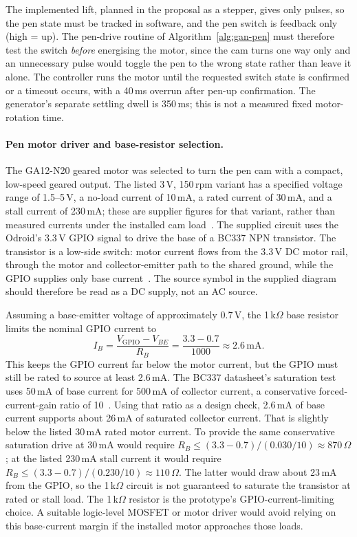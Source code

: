 The implemented lift, planned in the proposal as a stepper, gives only pulses, so the pen state must be tracked in software, and the pen switch is feedback only (high = up). The pen-drive routine of Algorithm~\ref{alg:gan-pen} must therefore test the switch \emph{before} energising the motor, since the cam turns one way only and an unnecessary pulse would toggle the pen to the wrong state rather than leave it alone. The controller runs the motor until the requested switch state is confirmed or a timeout occurs, with a 40\,ms overrun after pen-up confirmation. The generator's separate settling dwell is 350\,ms; this is not a measured fixed motor-rotation time.

\paragraph{Pen motor driver and base-resistor selection.}
The GA12-N20 geared motor was selected to turn the pen cam with a compact, low-speed geared output. The listed 3\,V, 150\,rpm variant has a specified voltage range of 1.5--5\,V, a no-load current of 10\,mA, a rated current of 30\,mA, and a stall current of 230\,mA; these are supplier figures for that variant, rather than measured currents under the installed cam load~\cite{ga12n20ds}. The supplied circuit uses the Odroid's 3.3\,V GPIO signal to drive the base of a BC337 NPN transistor. The transistor is a low-side switch: motor current flows from the 3.3\,V DC motor rail, through the motor and collector-emitter path to the shared ground, while the GPIO supplies only base current~\cite{odroidn2ds}. The source symbol in the supplied diagram should therefore be read as a DC supply, not an AC source.

Assuming a base-emitter voltage of approximately 0.7\,V, the 1\,k$\Omega$ base resistor limits the nominal GPIO current to
\begin{equation}
I_B = \frac{V_{\mathrm{GPIO}}-V_{BE}}{R_B} = \frac{3.3-0.7}{1000} \approx 2.6\,\mathrm{mA}.
\label{eq:des-basecurrent}
\end{equation}
This keeps the GPIO current far below the motor current, but the GPIO must still be rated to source at least 2.6\,mA. The BC337 datasheet's saturation test uses 50\,mA of base current for 500\,mA of collector current, a conservative forced-current-gain ratio of 10~\cite{bc337ds}. Using that ratio as a design check, 2.6\,mA of base current supports about 26\,mA of saturated collector current. That is slightly below the listed 30\,mA rated motor current. To provide the same conservative saturation drive at 30\,mA would require $R_B\le(3.3-0.7)/(0.030/10)\approx870\,\Omega$; at the listed 230\,mA stall current it would require $R_B\le(3.3-0.7)/(0.230/10)\approx110\,\Omega$. The latter would draw about 23\,mA from the GPIO, so the 1\,k$\Omega$ circuit is not guaranteed to saturate the transistor at rated or stall load. The 1\,k$\Omega$ resistor is the prototype's GPIO-current-limiting choice. A suitable logic-level MOSFET or motor driver would avoid relying on this base-current margin if the installed motor approaches those loads.

